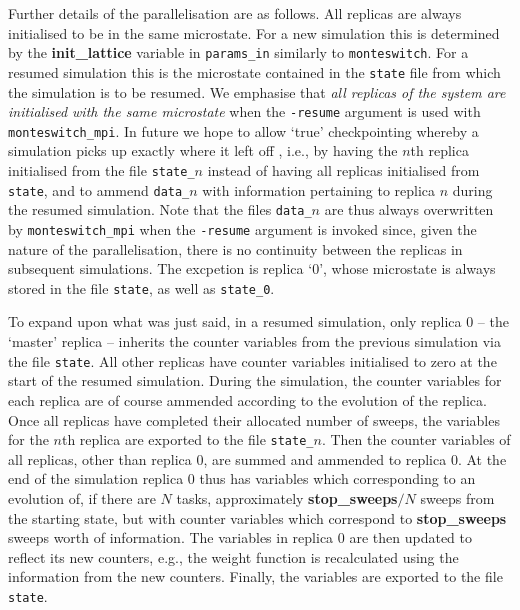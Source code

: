 \documentclass{report}
\begin{document}
Further details of the parallelisation are as follows. All replicas are always initialised to be in the same microstate. For a new simulation this is 
determined by the \textbf{init\_lattice} variable in \texttt{params\_in} similarly to \texttt{monteswitch}. For a resumed simulation this is the microstate 
contained in the \texttt{state} file from which the simulation is to be resumed. We emphasise that \emph{all replicas of the system are initialised with 
the same microstate} when the \texttt{-resume} argument is used with \texttt{monteswitch\_mpi}. In future we hope to allow `true' checkpointing 
whereby a simulation picks up exactly where it left off , i.e., by having the $n$th replica initialised from the file \texttt{state\_}$n$ instead of having
all replicas initialised from \texttt{state}, and to ammend \texttt{data\_}$n$ with information pertaining to replica $n$ during the resumed
simulation. Note that the files \texttt{data\_}$n$ are thus always overwritten by \texttt{monteswitch\_mpi} when the \texttt{-resume} argument is
invoked since, given the nature of the parallelisation, there is no continuity between the replicas in subsequent simulations. The excpetion is replica `0',
whose microstate is always stored in the file \texttt{state}, as well as \texttt{state\_0}.

To expand upon what was just said, in a resumed simulation, only replica 0 -- the `master' replica -- inherits the counter variables from the previous 
simulation via the file \texttt{state}. All other replicas have counter variables initialised to zero at the start of the resumed simulation.
During the simulation, the counter variables for each replica are of course ammended according to the evolution of the replica. Once all replicas have
completed their allocated number of sweeps, the variables for the $n$th replica are exported to the file \texttt{state\_}$n$. Then 
the counter variables of all replicas, other than replica 0, are summed and ammended to replica 0. At the end of the simulation replica 0 thus has
variables which corresponding to an evolution of, if there are $N$ tasks, approximately \textbf{stop\_sweeps}$/N$ sweeps from the starting state, 
but with counter variables which correspond to \textbf{stop\_sweeps} sweeps worth of information. The variables in replica 0 are then updated to reflect 
its new counters, e.g., the weight function is recalculated using the information from the new counters. Finally, the variables are
exported to the file \texttt{state}. 
\end{document}
